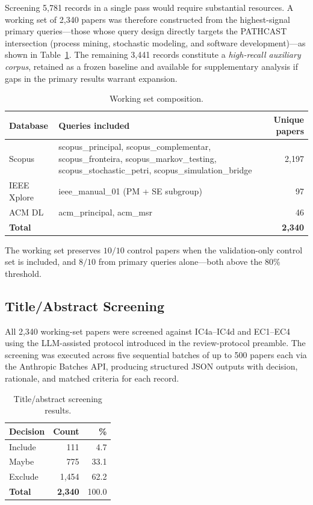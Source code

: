 Screening 5{,}781 records in a single pass would require substantial
resources. A working set of 2{,}340 papers was therefore constructed from the
highest-signal primary queries---those whose query design directly targets the
PATHCAST intersection (process mining, stochastic modeling, and software
development)---as shown in Table~\ref{tab:working-set}. The remaining 3{,}441
records constitute a \textit{high-recall auxiliary corpus}, retained as a
frozen baseline and available for supplementary analysis if gaps in the
primary results warrant expansion.

\begin{table}[htbp]
\centering
\caption{Working set composition.}
\label{tab:working-set}
\small
\setlength{\tabcolsep}{4pt}
\begin{tabular}{p{2.2cm} p{8.3cm} r}
\toprule
\textbf{Database} & \textbf{Queries included} & \textbf{Unique papers} \\
\midrule
Scopus & scopus\_principal, scopus\_complementar, scopus\_fronteira,
         scopus\_markov\_testing, scopus\_stochastic\_petri,
         scopus\_simulation\_bridge & 2{,}197 \\
IEEE Xplore & ieee\_manual\_01 (PM + SE subgroup) & 97 \\
ACM DL & acm\_principal, acm\_msr & 46 \\
\midrule
\textbf{Total} & & \textbf{2{,}340} \\
\bottomrule
\end{tabular}
\end{table}

The working set preserves $10/10$ control papers when the validation-only
control set is included, and $8/10$ from primary queries alone---both above
the 80\% threshold.

\subsection{Title/Abstract Screening}

All 2{,}340 working-set papers were screened against IC4a--IC4d and
EC1--EC4 using the LLM-assisted protocol introduced in the review-protocol
preamble. The screening was executed across five sequential batches of up
to 500 papers each via the Anthropic Batches API, producing structured
JSON outputs with decision, rationale, and matched criteria for each
record.

\begin{table}[htbp]
\centering
\caption{Title/abstract screening results.}
\label{tab:ta-screening}
\begin{tabular}{lrr}
\toprule
\textbf{Decision} & \textbf{Count} & \textbf{\%} \\
\midrule
Include & 111 & 4.7 \\
Maybe   & 775 & 33.1 \\
Exclude & 1{,}454 & 62.2 \\
\midrule
\textbf{Total} & \textbf{2{,}340} & 100.0 \\
\bottomrule
\end{tabular}
\end{table}

